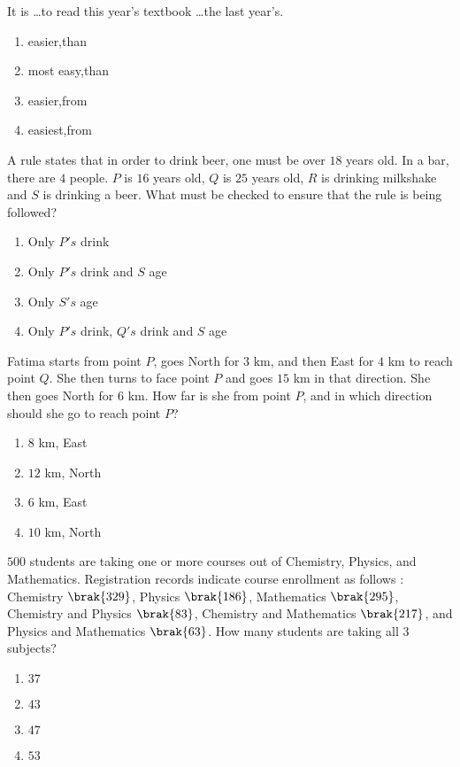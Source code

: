     \item It is \dots to read this year's textbook \dots the last year's.
    \begin{enumerate}
        \item easier,than
        \item most easy,than
        \item easier,from
        \item easiest,from
    \end{enumerate}
    \item A rule states that in order to drink beer, one must be over $18$ years old. In a bar, there are $4$ people. $P$ is $16$ years old, $Q$ is $25$ years old, $R$ is drinking milkshake and $S$ is drinking a beer. What must be checked to ensure that the rule is being followed?
    \begin{enumerate}
        \item Only $P\prime s$ drink
        \item Only $P\prime s$ drink and $S$ age
        \item Only $S\prime s$ age
        \item Only $P\prime s$ drink, $Q\prime s$ drink and $S$ age
    \end{enumerate}
    \item Fatima starts from point $P$, goes North for $3$ km, and then East for $4$ km to reach point $Q$. She then turns to face point $P$ and goes $15$ km in that direction. She then goes North for $6$ km. How far is she from point $P$, and in which direction should she go to reach point $P$?
    \begin{enumerate}
        \item $8$ km, East
        \item $12$ km, North
        \item $6$ km, East
        \item $10$ km, North
    \end{enumerate}
    \item $500$ students are taking one or more courses out of Chemistry, Physics, and Mathematics. Registration records indicate course enrollment as follows $\colon$ Chemistry $\brak{329}$, Physics $\brak{186}$, Mathematics $\brak{295}$, Chemistry and Physics $\brak{83}$, Chemistry and Mathematics $\brak{217}$, and Physics and Mathematics $\brak{63}$. How many students are taking all $3$ subjects?
    \begin{enumerate}
        \item $37$
        \item $43$
        \item $47$
        \item $53$
    \end{enumerate}
